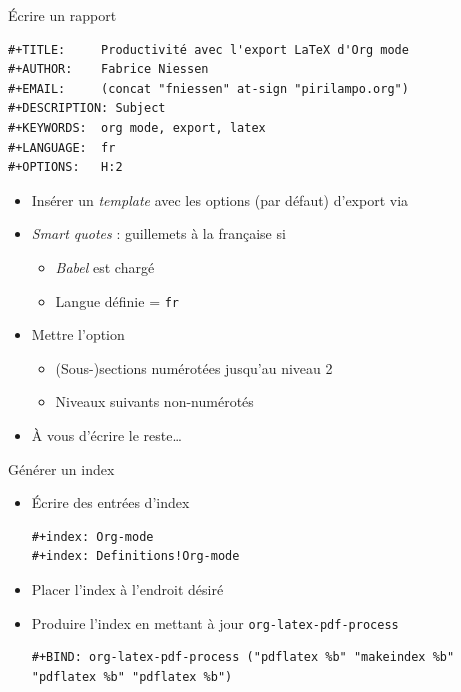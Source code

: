\documentclass[presentation,t]{beamer}
\let\ORIkeys\keys
\renewcommand{\keys}[1]{\ORIkeys{\texttt{#1}}}
\begin{document}
\begin{frame}[fragile,label={sec:org8e1710a}]{Écrire un rapport}
 \lstset{language=org,label= ,caption= ,captionpos=b,numbers=none}
\begin{lstlisting}
#+TITLE:     Productivité avec l'export LaTeX d'Org mode
#+AUTHOR:    Fabrice Niessen
#+EMAIL:     (concat "fniessen" at-sign "pirilampo.org")
#+DESCRIPTION: Subject
#+KEYWORDS:  org mode, export, latex
#+LANGUAGE:  fr
#+OPTIONS:   H:2
\end{lstlisting}

\begin{itemize}
\item Insérer un \emph{template} avec les options (par défaut) d'export via \keys{C-c C-e #}

\item \emph{Smart quotes} : guillemets à la française si
\begin{itemize}
\item \emph{Babel} est chargé
\item Langue définie = \texttt{fr}
\end{itemize}

\item Mettre l'option \keys{H:2}
\begin{itemize}
\item (Sous-)sections numérotées jusqu'au niveau 2
\item Niveaux suivants non-numérotés
\end{itemize}

\item À vous d'écrire le reste\ldots{}
\end{itemize}
\end{frame}

\begin{frame}[fragile,label={sec:orgee59e9b}]{Générer un index}
 \begin{itemize}
\item Écrire des entrées d'index

\lstset{language=org,label= ,caption= ,captionpos=b,numbers=none}
\begin{lstlisting}
#+index: Org-mode
#+index: Definitions!Org-mode
\end{lstlisting}

\item Placer l'index à l'endroit désiré

\item Produire l'index en mettant à jour \texttt{org-latex-pdf-process}

\lstset{language=org,label= ,caption= ,captionpos=b,numbers=none}
\begin{lstlisting}
#+BIND: org-latex-pdf-process ("pdflatex %b" "makeindex %b" "pdflatex %b" "pdflatex %b")
\end{lstlisting}
\end{itemize}
\end{frame}
\end{document}

